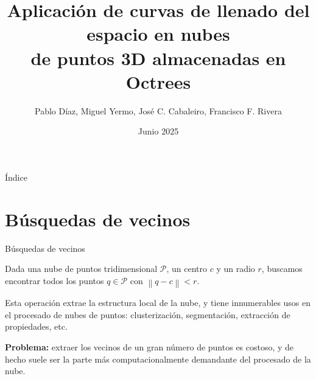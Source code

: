 \documentclass[aspectratio=169]{beamer}
\title{Aplicación de curvas de llenado del espacio en nubes \\ de puntos 3D almacenadas en Octrees}
\author{Pablo Díaz, Miguel Yermo, José C. Cabaleiro, Francisco F. Rivera}
\date{Junio 2025}
\def\toctitle{Índice}
\begin{document}
\begin{frame}[plain]%
    \titlepage%
    
\end{frame}
  
\begin{frame}[plain]{\toctitle}
    \tableofcontents
\end{frame}
\setcounter{framenumber}{0} %

\section{Búsquedas de vecinos}

\begin{frame}{Búsquedas de vecinos}

Dada una nube de puntos tridimensional $\mathcal{P}$, un centro $c$ y un radio $r$, buscamos encontrar todos los puntos $q \in \mathcal{P}$ con $\left\lVert q-c \right\rVert < r$.

Esta operación extrae la estructura local de la nube, y tiene innumerables usos en el procesado de nubes de puntos: clusterización, segmentación, extracción de propiedades, etc.
\vspace{2em}

\textbf{Problema:} extraer los vecinos de un gran número de puntos es costoso, y de hecho suele ser la parte más computacionalmente demandante del procesado de la nube.
\end{frame}
\end{document}
